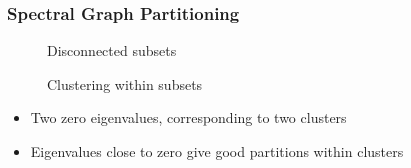 \documentclass[9pt]{beamer}
\begin{document}
\begin{frame}
\frametitle{Spectral Graph Partitioning}
\label{sec-3-19}

\vspace*{-0.0cm}\begin{figure}
      \caption{Disconnected subsets}
\end{figure}
\vspace*{-0.0cm}\begin{figure}
      \caption{Clustering within subsets}
\end{figure}
\begin{itemize}
\item Two zero eigenvalues, corresponding to two clusters
\item Eigenvalues close to zero give good partitions within clusters
\end{itemize}
\end{frame}
\end{document}
